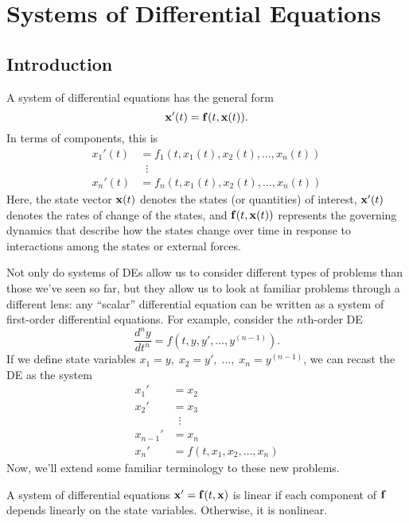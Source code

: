 \documentclass[../m082main.tex]{subfiles}
\begin{document}
\chapter{Systems of Differential Equations}

\section{Introduction}
\medskip
\begin{definition}
    A system of differential equations has the general form
    \[ \mathbf{x}'(t) = \mathbf{f}(t, \mathbf{x}(t)). \]
    In terms of components, this is
    \begin{align*}
        x_1'(t) &= f_1 (t, x_1(t), x_2(t), \ldots, x_n(t)) \\
        &\;\;\vdots \\
        x_n'(t) &= f_n (t, x_1(t), x_2(t), \ldots, x_n(t))
    \end{align*}
    Here, the state vector $\mathbf{x}(t)$ denotes the states (or quantities) of interest, $\mathbf{x}'(t)$ denotes the rates of change of the states, and $\mathbf{f}(t, \mathbf{x}(t))$ represents the governing dynamics that describe how the states change over time in response to interactions among the states or external forces.
\end{definition}

Not only do systems of DEs allow us to consider different types of problems than those we've seen so far, but they allow us to look at familiar problems through a different lens: any ``scalar'' differential equation can be written as a system of first-order differential equations.
For example, consider the $n$th-order DE
\[ \frac{d^{n}y}{dt^{n}} = f(t, y, y', \ldots, y^{(n-1)}). \]
If we define state variables $x_1 = y,\; x_2 = y',\; \ldots,\; x_n = y^{(n-1)}$, we can recast the DE as the system
\begin{align*}
    x_1' &= x_2 \\
    x_2' &= x_3 \\
    &\;\;\vdots \\
    x_{n-1}' &= x_n \\
    x_n' &= f(t, x_1, x_2, \ldots, x_n)
\end{align*}
Now, we'll extend some familiar terminology to these new problems.

\begin{definition}
    A system of differential equations $\mathbf{x}' = \mathbf{f}(t, \mathbf{x})$ is linear if each component of $\mathbf{f}$ depends linearly on the state variables.
    Otherwise, it is nonlinear.
\end{definition}
\end{document}
